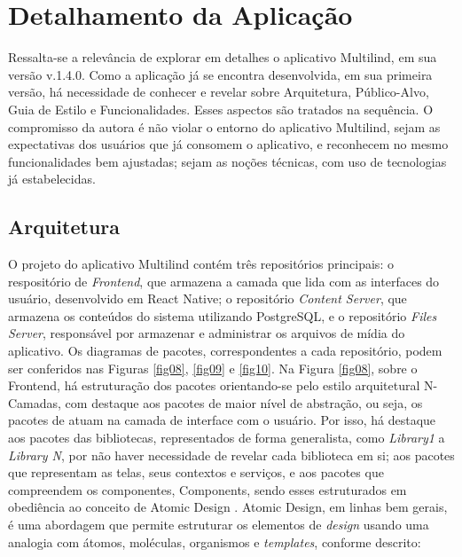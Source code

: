 \section{Detalhamento da Aplicação}
\label{sec:Detalhamento da Aplicacao}
Ressalta-se a relevância de explorar em detalhes o aplicativo Multilind, em sua versão v.1.4.0. Como a aplicação já se encontra desenvolvida, em sua primeira versão, há necessidade de conhecer e revelar sobre Arquitetura, Público-Alvo, Guia de Estilo e Funcionalidades. Esses aspectos são 
tratados na sequência. O compromisso da autora é não violar o entorno do aplicativo Multilind, sejam as expectativas dos usuários que já consomem o aplicativo, e reconhecem no mesmo funcionalidades bem ajustadas; sejam as noções técnicas, com uso de tecnologias já estabelecidas.

\subsection{Arquitetura}
\label{Arquitetura}
O projeto do aplicativo Multilind contém três repositórios principais: o respositório de \textit{Frontend}, que armazena a camada que lida com as interfaces do usuário, desenvolvido em React Native; o repositório \textit{Content Server}, que armazena os conteúdos do sistema 
utilizando PostgreSQL, e o repositório \textit{Files Server}, responsável por armazenar e administrar os arquivos de mídia do aplicativo. Os diagramas de  pacotes, correspondentes a cada repositório, podem ser conferidos nas Figuras \ref{fig08}, \ref{fig09} e \ref{fig10}. Na Figura \ref{fig08}, sobre 
o Frontend, há estruturação dos pacotes orientando-se pelo estilo arquitetural N-Camadas, com destaque aos pacotes de maior nível de abstração, ou seja, os pacotes de atuam na camada de interface com o usuário. Por isso, há destaque aos pacotes das bibliotecas, representados de forma generalista, 
como \textit{Library1} a \textit{Library N}, por não haver necessidade de revelar cada biblioteca em si; aos pacotes que representam as telas, seus contextos e serviços, e aos pacotes que compreendem os componentes, Components, sendo esses estruturados em obediência ao conceito de Atomic Design \cite{atomic}. 
Atomic Design, em linhas bem gerais, é uma abordagem que permite estruturar os elementos de \textit{design} usando uma analogia com átomos, moléculas, organismos e \textit{templates}, conforme descrito:

